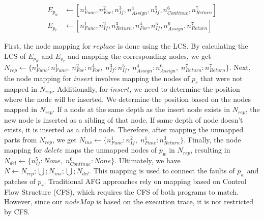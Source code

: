 \documentclass[10pt,conference]{IEEEtran}
\begin{document}
        \begin{align*}
            E_{p_{w}} &\gets [n^{1}_{Func},n^{2}_{For},n^{3}_{If},n^{4}_{Assign},n^{5}_{If},n^{6}_{Continue},n^{7}_{Return}] \\
            E_{p_{r}} &\gets [n^{1}_{Func},n^{2}_{If},n^{3}_{Return},n^{4}_{For},n^{5}_{If},n^{6}_{Assign},n^{7}_{Return}]
        \end{align*}

        First, the node mapping for $replace$ is done using the LCS. By calculating the LCS of $E_{p_{w}}$ and $E_{p_{r}}$ and mapping the corresponding nodes, we get $N_{rep} \gets \{n^{1}_{Func}:n^{1}_{Func},\;n^{2}_{For}:n^{4}_{For},\;n^{3}_{If}:n^{5}_{If},\;n^{4}_{Assign}:n^{6}_{Assign},\;n^{7}_{Return}:n^{7}_{Return}\}$. Next, the node mapping for $insert$ involves mapping the nodes of $p_{r}$ that were not mapped in $N_{rep}$. Additionally, for $insert$, we need to determine the position where the node will be inserted. We determine the position based on the nodes mapped in $N_{rep}$. If a node at the same depth as the insert node exists in $N_{rep}$, the new node is inserted as a sibling of that node. If same depth of node doesn't exists, it is inserted as a child node. Therefore, after mapping the unmapped parts from $N_{rep}$, we get $N_{ins} \gets \{n^{1}_{Func}:n^{2}_{If},\;n^{1}_{Func}:n^{3}_{Return}\}$. Finally, the node mapping for $delete$ maps the unmapped nodes of $p_{w}$ in $N_{rep}$, resulting in $N_{del} \gets \{n^{5}_{If}:None,\;n^{6}_{Continue}:None\}$. Ultimately, we have $N \gets N_{rep};\bigcup;N_{ins};\bigcup;N_{del}$. This mapping is used to connect the faults of $p_{w}$ and patches of $p_{r}$. Traditional AFG approaches rely on mapping based on Control Flow Structure (CFS), which requires the CFS of both programs to match. However, since our $nodeMap$ is based on the execution trace, it is not restricted by CFS.
\end{document}
